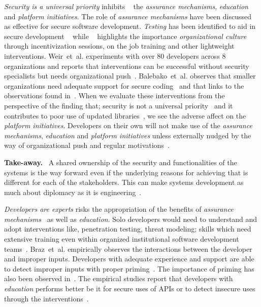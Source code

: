 \documentclass[conference]{IEEEtran}
\newenvironment{finding}{\begin{framed}\noindent\textbf{Take-away.}~}{\end{framed}}
\newcommand{\etal}[0]{et~al{.}}
\begin{document}
\emph{Security is a universal priority} inhibits ~\cite{witschey2015,weir2020,McGraw2018} the \emph{assurance mechanisms},  \emph{education} and \emph{platform initiatives}. The role of \emph{assurance mechanisms} have been discussed as effective for secure software development. \emph{Testing} has been identified to aid in secure development ~\cite{jose2016} while ~\cite{weir2020,haney2018,thomas2018} highlights the importance \emph{organizational culture} through incentivization sessions, on the job training and other lightweight interventions. Weir~\etal{} experiments with over 80 developers across 8 organizations and reports that interventions can be successful without security specialists but needs organizational push~\cite{weir2021,tondel2008}. Balebako~\etal{} observes that smaller organizations need adequate support for secure coding~\cite{balebako2014} and that links to the observations found in~\cite{weir2021}. When we evaluate these interventions from the perspective of the finding that; security is not a universal priority~\cite{acar2016,tahaei2019} and it contributes to poor use of updated libraries~\cite{vaniea2016}, we see the adverse affect on the \emph{platform initiatives}. Developers on their own will not make use of the \emph{assurance mechanisms}, \emph{education} and \emph{platform initiatives} unless externally nudged by the way of organizational push and regular motivations~\cite{aside2012,weir2020,weir2021,adoption2014}.  

\begin{finding}
\noindent  
A shared ownership of the security and functionalities of the systems is the way forward even if the underlying reasons for achieving that is different for each of the stakeholders. This can make systems development as much about diplomacy as it is engineering~\cite{bruce2013}.   
\end{finding}

\emph{Developers are experts} risks the appropriation of the benefits of \emph{assurance mechanisms}~\cite{weir2020,hala2016} as well as \emph{education}. Solo developers would need to understand and adopt interventions like, penetration testing, threat modeling; skills which need extensive training even within organized institutional software development teams~\cite{weir2020}. 
Braz~\etal{} empirically observes the interactions between the developer and improper inputs. Developers with adequate experience and support are able to detect improper inputs with proper priming~\cite{braz2021}. The importance of priming has also been observed in~\cite{joseph2021,thomas2018}. The empirical studies report that developers with \emph{education} performs better be it for secure uses of APIs or to detect insecure uses through the interventions~\cite{madiha2017,naiakshina2018,zhu2014}.
\end{document}
